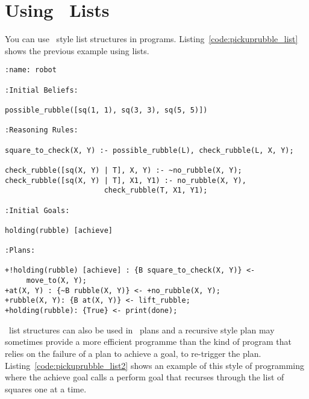 \documentclass[a4]{article}
\begin{document}
\section{Using \prolog\ Lists}
You can use \prolog\ style list structures in \gwendolen programs.  Listing~\ref{code:pickuprubble_list} shows the previous example using lists.
\begin{lstlisting}[float,caption=Pick Up Rubble (with \prolog\ lists in Reasoning Rules),basicstyle=\sffamily,style=easslisting,language=Gwendolen,label=code:pickuprubble_list]
:name: robot

:Initial Beliefs:

possible_rubble([sq(1, 1), sq(3, 3), sq(5, 5)])

:Reasoning Rules:

square_to_check(X, Y) :- possible_rubble(L), check_rubble(L, X, Y);

check_rubble([sq(X, Y) | T], X, Y) :- ~no_rubble(X, Y);
check_rubble([sq(X, Y) | T], X1, Y1) :- no_rubble(X, Y), 
                       check_rubble(T, X1, Y1);

:Initial Goals:

holding(rubble) [achieve]

:Plans:

+!holding(rubble) [achieve] : {B square_to_check(X, Y)} <-
     move_to(X, Y);
+at(X, Y) : {~B rubble(X, Y)} <- +no_rubble(X, Y);
+rubble(X, Y): {B at(X, Y)} <- lift_rubble;
+holding(rubble): {True} <- print(done);
\end{lstlisting}

\prolog\ list structures can also be used in \gwendolen\ plans and a recursive style plan may sometimes provide a more efficient programme than the kind of program that relies on the failure of a plan to achieve a goal, to re-trigger the plan.  Listing~\ref{code:pickuprubble_list2} shows an example of this style of programming where the achieve goal calls a perform goal that recurses through the list of squares one at a time.
\end{document}
